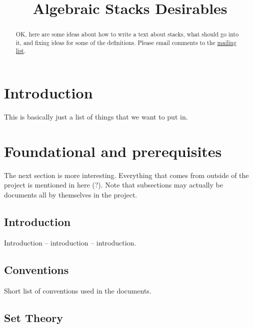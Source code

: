 

%


\title{Algebraic Stacks Desirables}

\begin{abstract}
OK, here are some ideas about how to write a text about 
stacks, what should go into it, and fixing ideas for some
of the definitions. Please email comments to the
\href{http://www.math.columbia.edu/mailman/listinfo/algebraic_geometry}%
{mailing list}.
\end{abstract}

\maketitle

\tableofcontents

\section{Introduction}
\label{section-introduction}

\noindent
This is basically just a list of things that we want to put in.

\section{Foundational and prerequisites}
\label{section-foundational}

\noindent
The next section is more interesting. Everything that comes from outside 
of the project is mentioned in here (?). Note that subsections may actually
be documents all by themselves in the project.

\subsection{Introduction}
\label{subsection-introduction}

\noindent
Introduction -- introduction -- introduction.

\subsection{Conventions}
\label{subsection-conventions}

\noindent
Short list of conventions used in the documents.

\subsection{Set Theory}
\label{subsection-set-theory}

